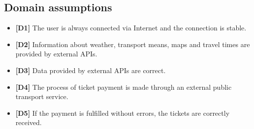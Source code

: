 \subsection{Domain assumptions}
\begin{itemize}
	
\item \textbf{[D1]} The user is always connected via Internet and the connection is stable.
\item \textbf{[D2]} Information about weather, transport means, maps and travel times are provided by external APIs.
\item \textbf{[D3]} Data provided by external APIs are correct.
\item \textbf{[D4]} The process of ticket payment is made through an external public transport service.
\item \textbf{[D5]} If the payment is fulfilled without errors, the tickets are correctly received.

\end{itemize}

